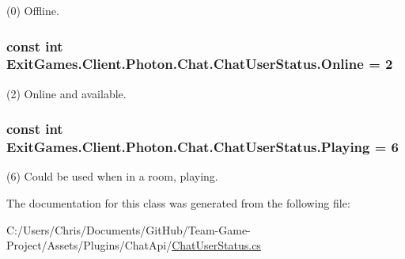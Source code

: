 (0) Offline.

\subsubsection[{\texorpdfstring{Online}{Online}}]{\setlength{\rightskip}{0pt plus 5cm}const int Exit\+Games.\+Client.\+Photon.\+Chat.\+Chat\+User\+Status.\+Online = 2}\hypertarget{class_exit_games_1_1_client_1_1_photon_1_1_chat_1_1_chat_user_status_af9f7b1d3f7cb4f6acb966679e7080ac2}{}\label{class_exit_games_1_1_client_1_1_photon_1_1_chat_1_1_chat_user_status_af9f7b1d3f7cb4f6acb966679e7080ac2}


(2) Online and available.

\subsubsection[{\texorpdfstring{Playing}{Playing}}]{\setlength{\rightskip}{0pt plus 5cm}const int Exit\+Games.\+Client.\+Photon.\+Chat.\+Chat\+User\+Status.\+Playing = 6}\hypertarget{class_exit_games_1_1_client_1_1_photon_1_1_chat_1_1_chat_user_status_a6db26d8e73bd24a01a9239caab6c6112}{}\label{class_exit_games_1_1_client_1_1_photon_1_1_chat_1_1_chat_user_status_a6db26d8e73bd24a01a9239caab6c6112}


(6) Could be used when in a room, playing.



The documentation for this class was generated from the following file\+:\begin{DoxyCompactItemize}
\item 
C\+:/\+Users/\+Chris/\+Documents/\+Git\+Hub/\+Team-\/\+Game-\/\+Project/\+Assets/\+Plugins/\+Chat\+Api/\hyperlink{_chat_user_status_8cs}{Chat\+User\+Status.\+cs}\end{DoxyCompactItemize}
